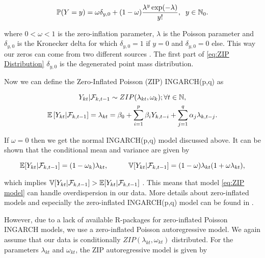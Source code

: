 \begin{equation}
\mathbb{P}(Y=y) = \omega \delta_{y,0}+ (1-\omega) \frac{\lambda^y \exp(-\lambda)}{y!}, \hspace{0.2cm} y \in \mathbb{N}_0.
\label{eq:ZIP Distribution}
\end{equation}

where $0 < \omega < 1$ is the zero-inflation parameter, $\lambda$ is the Poisson parameter and $\delta_{y,0}$ is the Kronecker delta for which $\delta_{y,0}=1$ if $y=0$ and $\delta_{y,0}=0$ else. This way our zeros can come from two different sources \cite{Zhu:2012}. The first part of \ref{eq:ZIP Distribution} $\delta_{y,0}$ is the degenerated point mass distribution.

Now we can define the Zero-Inflated Poisson (ZIP) INGARCH(p,q) as

\begin{gather}
\label{eq:ZIP model}
Y_{kt} | \mathcal{F}_{k,t-1} \sim ZIP(\lambda_{kt},\omega_k); \forall t \in \mathbb{N}, \\
\mathbb{E}\left[Y_{kt} | \mathcal{F}_{k,t-1} \right] = \lambda_{kt} = \beta_0 + \sum_{i=1}^p\beta_i Y_{k,t-i} + \sum_{j=1}^q\alpha_j \lambda_{k,t-j}.
\end{gather}

If $\omega =0$ then we get the normal INGARCH(p,q) model discussed above. It can be shown that the conditional mean and variance are given by

\begin{equation}
\mathbb{E}[Y_{kt} | \mathcal{F}_{k,t-1}] = (1-\omega_k)\lambda_{kt}, \hspace{1cm} \mathbb{V}[Y_{kt} | \mathcal{F}_{k,t-1}] =(1-\omega)\lambda_{kt}(1+\omega \lambda_{kt}),
\label{eq:Conditional Mean and Variance ZIP}
\end{equation}

which implies $ \mathbb{V}[Y_{kt} | \mathcal{F}_{k,t-1}] > \mathbb{E}[Y_{kt} | \mathcal{F}_{k,t-1}]$ \cite{Zhu:2012}. This means that model \ref{eq:ZIP model} can handle overdispersion in our data. More details about zero-inflated models and especially the zero-inflated INGARCH(p,q) model can be found in \cite{Zhu:2012}.

However, due to a lack of available R-packages for zero-inflated Poisson INGARCH models, we use a zero-inflated Poisson autoregressive model. We again assume that our data is conditionally $ZIP(\lambda_{kt},\omega_{kt})$ distributed. For the parameters $\lambda_{kt}$ and $\omega_{kt}$, the ZIP autoregressive model is given by \cite{Lambert:1992}

